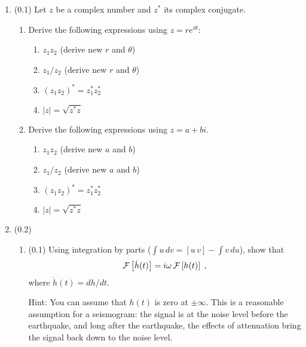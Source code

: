 \documentclass[11pt,titlepage,fleqn]{article}
\newcommand{\fft}{h}
\begin{document}

\begin{enumerate}

\item (0.1) Let $z$ be a complex number and $z^*$ its complex conjugate.

\begin{enumerate}

\item Derive the following expressions using $z = r e^{i\theta}$:
%
\begin{enumerate}
\item $z_1 z_2$ (derive new $r$ and $\theta$)
\item $z_1 / z_2$ (derive new $r$ and $\theta$)
\item $(z_1 z_2)^* = z_1^* z_2^*$
\item $|z| = \sqrt{z^* z}$
\end{enumerate}

\item Derive the following expressions using $z = a+bi$.
%
\begin{enumerate}
\item $z_1 z_2$ (derive new $a$ and $b$)
\item $z_1 / z_2$ (derive new $a$ and $b$)
\item $(z_1 z_2)^* = z_1^* z_2^*$
\item $|z| = \sqrt{z^* z}$
\end{enumerate}

\end{enumerate}


\item (0.2)

\begin{enumerate}
\item (0.1) Using integration by parts ($\int u\,dv = [u\,v] - \int v\,du$), show that 
%
\begin{eqnarray}
\cF \left[ \dot{\fft}(t) \right] = i\omega \, \cF \left[ \fft(t) \right]
\label{fftder1}
\;,
\end{eqnarray}
%
where $\dot{\fft}(t) = d\fft/dt$.

Hint: You can assume that $h(t)$ is zero at $\pm\infty$. This is a reasonable assumption for a seismogram: the signal is at the noise level before the earthquake, and long after the earthquake, the effects of attenuation bring the signal back down to the noise level.


\end{enumerate}
\end{enumerate}
\end{document}
